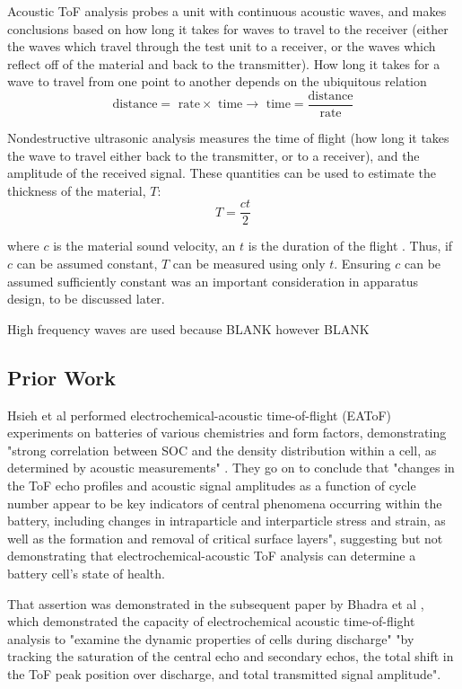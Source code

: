 Acoustic ToF analysis probes a unit with continuous acoustic waves, and makes conclusions based on how long it takes for waves to travel to the receiver (either the waves which travel through the test unit to a receiver, or the waves which reflect off of the material and back to the transmitter). How long it takes for a wave to travel from one point to another depends on the ubiquitous relation 
$$\text{distance} = \text{ rate} \times \text{ time} \rightarrow \text{ time} = \frac{\text{distance}}{\text{rate}}$$

Nondestructive ultrasonic analysis measures the time of flight (how long it takes the wave to travel either back to the transmitter, or to a receiver), and the amplitude of the received signal. These quantities can be used to estimate the thickness of the material, $T$:
$$ T = \frac{ct}{2}$$

where $c$ is the material sound velocity, an $t$ is the duration of the flight \cite{OLYMPUS}. 
Thus, if $c$ can be assumed constant, $T$ can be measured using only $t$.
Ensuring $c$ can be assumed sufficiently constant was an important consideration in apparatus design, to be discussed later.

High frequency waves are used because BLANK however BLANK

\subsection{Prior Work}

Hsieh et al  performed electrochemical-acoustic time-of-flight (EAToF) experiments on batteries of various chemistries and form factors, demonstrating "strong correlation between SOC and the density distribution within a cell, as determined by acoustic measurements" \cite{TOF-STATE}. They go on to conclude that "changes in the ToF echo profiles and acoustic signal amplitudes as a function of cycle number appear to be key indicators of central phenomena occurring within the battery, including changes in intraparticle and interparticle stress and strain, as well as the formation and removal of critical surface layers", suggesting but not demonstrating that electrochemical-acoustic ToF analysis can determine a battery cell's state of health.

That assertion was demonstrated in the subsequent paper by Bhadra et al  \cite{ANODE-CHAR}, which demonstrated the capacity of electrochemical acoustic time-of-flight analysis to "examine the dynamic properties of cells during discharge" "by tracking the saturation of the central echo and secondary echos, the total shift in the ToF peak position over discharge, and total transmitted signal amplitude".

